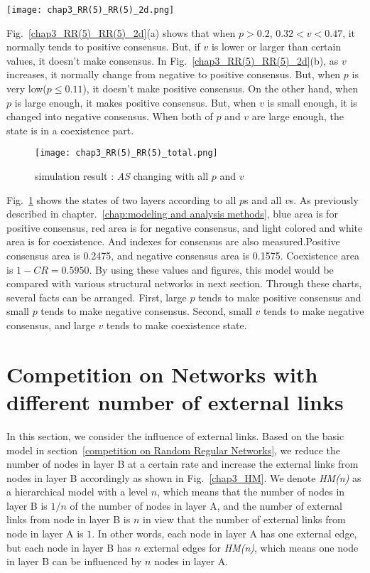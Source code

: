 \begin{figure*}[!htb]
	\centering
	\texttt{[image: chap3\_RR(5)\_RR(5)\_2d.png]}
	\caption{(a) $p$-\textit{AS} chart according to certain $v$ values. (b) $v$-\textit{AS} chart according to certain $p$ values.}
	\label{chap3_RR(5)_RR(5)_2d}
\end{figure*}
Fig.~\ref{chap3_RR(5)_RR(5)_2d}(a) shows that when $p > 0.2$, $0.32 < v < 0.47$, it normally tends to positive consensus. But, if $v$ is lower or larger than certain values, it doesn't make consensus.
In Fig.~\ref{chap3_RR(5)_RR(5)_2d}(b), as $v$ increases, it normally change from negative to positive consensus. But, when $p$ is very low($p \le 0.11$), it doesn't make positive consensus. On the other hand, when $p$ is large enough, it makes positive consensus. But, when $v$ is small enough, it is changed into negative consensus. When both of $p$ and $v$ are large enough, the state is in a coexistence part.

\begin{figure}[!htb]
	\centering
	\texttt{[image: chap3\_RR(5)\_RR(5)\_total.png]}
	\caption{simulation result : \textit{AS} changing with all $p$ and $v$}
	\label{chap3_RR(5)_RR(5)_total}
\end{figure}
Fig.~\ref{chap3_RR(5)_RR(5)_total} shows the states of two layers according to all $p$s and all $v$s. As previously described in chapter.~\ref{chap:modeling and analysis methods}, blue area is for positive consensus, red area is for negative consensus, and light colored and white area is for coexistence. And indexes for consensus are also measured.Positive consensus area is 0.2475, and negative consensus area is 0.1575. Coexistence area is $1 - CR = 0.5950$. By using these values and figures, this model would be compared with various structural networks in next section. Through these charts, several facts can be arranged. First, large $p$ tends to make positive consensus and small $p$ tends to make negative consensus. Second, small $v$ tends to make negative consensus, and large $v$ tends to make coexistence state. 

\section{Competition on Networks with different number of external links}

In this section, we consider the influence of external links. Based on the basic model in section~\ref{competition on Random Regular Networks}, we reduce the number of nodes in layer B at a certain rate and increase the external links from nodes in layer B accordingly as shown in Fig.~\ref{chap3_HM}.  We denote \textit{HM(n)} as a hierarchical model with a level $n$, which means that the number of nodes in layer B is $1/n$ of the number of nodes in layer A, and the number of external links from node in layer B is $n$ in view that the number of external links from node in layer A is $1$. In other words, each node in layer A has one external edge, but each node in layer B has $n$ external edges for \textit{HM(n)}, which means one node in layer B can be influenced by $n$ nodes in layer A.

